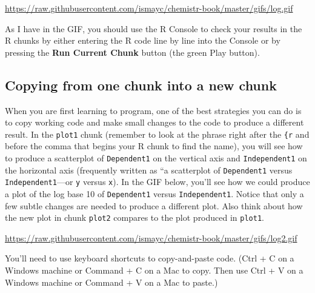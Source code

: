 \documentclass[]{tufte-book}
\begin{document}
\vspace{0.1in}

\begin{center}\footnotesize{\url{https://raw.githubusercontent.com/ismayc/chemistr-book/master/gifs/log.gif}}\end{center}

\vspace{0.1in}

As I have in the GIF, you should use the R Console to check your results
in the R chunks by either entering the R code line by line into the
Console or by pressing the \textbf{Run Current Chunk} button (the green
Play button).

\subsection{Copying from one chunk into a new
chunk}\label{copying-from-one-chunk-into-a-new-chunk}

When you are first learning to program, one of the best strategies you
can do is to copy working code and make small changes to the code to
produce a different result. In the \texttt{plot1} chunk (remember to
look at the phrase right after the \texttt{\{r} and before the comma
that begins your R chunk to find the name), you will see how to produce
a scatterplot of \texttt{Dependent1} on the vertical axis and
\texttt{Independent1} on the horizontal axis (frequently written as ``a
scatterplot of \texttt{Dependent1} versus \texttt{Independent1}---or
\texttt{y} versus \texttt{x}). In the GIF below, you'll see how we could
produce a plot of the log base 10 of \texttt{Dependent1} versus
\texttt{Independent1}. Notice that only a few subtle changes are needed
to produce a different plot. Also think about how the new plot in chunk
\texttt{plot2} compares to the plot produced in \texttt{plot1}.

\vspace{0.1in}

\begin{center}\footnotesize{\url{https://raw.githubusercontent.com/ismayc/chemistr-book/master/gifs/log2.gif}}\end{center}

\vspace{0.1in}

You'll need to use keyboard shortcuts to copy-and-paste code. (Ctrl + C
on a Windows machine or Command + C on a Mac to copy. Then use Ctrl + V
on a Windows machine or Command + V on a Mac to paste.)
\end{document}
